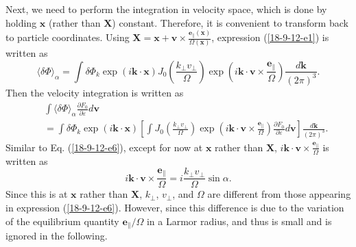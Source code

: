 \documentclass{llncs}
\begin{document}
Next, we need to perform the integration in velocity space, which is done by
holding $\mathbf{x}$ (rather than $\mathbf{X}$) constant. Therefore, it is
convenient to transform back to particle coordinates. Using
$\mathbf{X}=\mathbf{x}+\mathbf{v} \times \frac{\mathbf{e}_{\parallel}
(\mathbf{x})}{\Omega (\mathbf{x})}$, expression (\ref{18-9-12-e1}) is written
as
\begin{equation}
  \langle \delta \Phi \rangle_{\alpha} = \int \delta \Phi_k \exp (i\mathbf{k}
  \cdot \mathbf{x}) J_0 \left( \frac{k_{\perp} v_{\perp}}{\Omega} \right) \exp
  \left( i\mathbf{k} \cdot \mathbf{v} \times
  \frac{\mathbf{e}_{\parallel}}{\Omega} \right) \frac{d\mathbf{k}}{(2 \pi)^3}
  .
\end{equation}
Then the velocity integration is written as
\begin{eqnarray}
  &  & \int \langle \delta \Phi \rangle_{\alpha} \frac{\partial F_0}{\partial
  \varepsilon} d\mathbf{v} \nonumber\\
  &  & = \int \delta \Phi_k \exp (i\mathbf{k} \cdot \mathbf{x}) \left[ \int
  J_0 \left( \frac{k_{\perp} v_{\perp}}{\Omega} \right) \exp \left(
  i\mathbf{k} \cdot \mathbf{v} \times \frac{\mathbf{e}_{\parallel}}{\Omega}
  \right) \frac{\partial F_0}{\partial \varepsilon} d\mathbf{v} \right]
  \frac{d\mathbf{k}}{(2 \pi)^3} .  \label{18-9-12-e5}
\end{eqnarray}
Similar to Eq. (\ref{18-9-12-e6}), except for now at $\mathbf{x}$ rather than
$\mathbf{X}$, $i\mathbf{k} \cdot \mathbf{v} \times
\frac{\mathbf{e}_{\parallel}}{\Omega}$ is written as
\begin{equation}
  \label{18-9-13-p4} i\mathbf{k} \cdot \mathbf{v} \times
  \frac{\mathbf{e}_{\parallel}}{\Omega} = i \frac{k_{\perp} v_{\perp}}{\Omega}
  \sin \alpha .
\end{equation}
Since this is at $\mathbf{x}$ rather than $\mathbf{X}$, $k_{\perp}$,
$v_{\perp}$, and $\Omega$ are different from those appearing in expression
(\ref{18-9-12-e6}). However, since this difference is due to the variation of
the equilibrium quantity $\mathbf{e}_{\parallel} / \Omega$ in a Larmor radius,
and thus is small and is ignored in the following.
\end{document}
